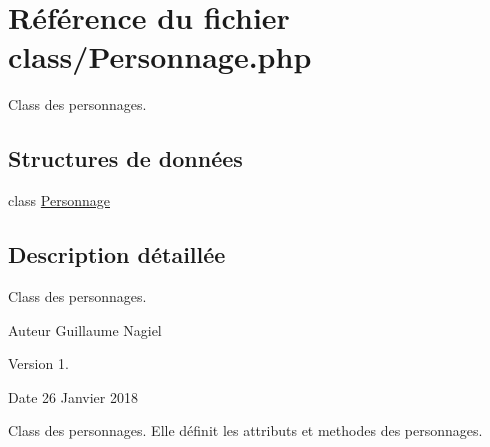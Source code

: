 \hypertarget{_personnage_8php}{}\section{Référence du fichier class/\+Personnage.php}
\label{_personnage_8php}


Class des personnages.  


\subsection*{Structures de données}
\begin{DoxyCompactItemize}
\item 
class \mbox{\hyperlink{class_personnage}{Personnage}}
\end{DoxyCompactItemize}


\subsection{Description détaillée}
Class des personnages. 

\begin{DoxyAuthor}{Auteur}
Guillaume Nagiel 
\end{DoxyAuthor}
\begin{DoxyVersion}{Version}
1. 
\end{DoxyVersion}
\begin{DoxyDate}{Date}
26 Janvier 2018
\end{DoxyDate}
Class des personnages. Elle définit les attributs et methodes des personnages. 